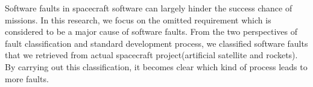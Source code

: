 Software faults in spacecraft software can largely hinder the success chance of missions.
In this research, we focus on the omitted requirement which is considered to be a major cause of software faults.
From the two perspectives of fault classification and standard development process, we classified software faults that we retrieved from actual spacecraft project(artificial satellite and rockets).
By carrying out this classification, it becomes clear which kind of process leads to more faults.
